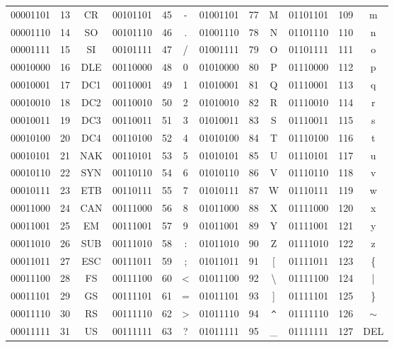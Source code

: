 \documentclass[12pt, oneside, landscape]{article}
\begin{document}
\begin{center}
\begin{tabular}{|ccc|ccc|ccc|ccc|}
    00001101 & 13 & CR   & 00101101 & 45 & -         & 01001101 & 77 & M   & 01101101 & 109 & m   \\
    00001110 & 14 & SO   & 00101110 & 46 & .         & 01001110 & 78 & N   & 01101110 & 110 & n   \\
    00001111 & 15 & SI   & 00101111 & 47 & /         & 01001111 & 79 & O   & 01101111 & 111 & o   \\
    00010000 & 16 & DLE  & 00110000 & 48 & 0         & 01010000 & 80 & P   & 01110000 & 112 & p   \\
    00010001 & 17 & DC1  & 00110001 & 49 & 1         & 01010001 & 81 & Q   & 01110001 & 113 & q   \\
    00010010 & 18 & DC2  & 00110010 & 50 & 2         & 01010010 & 82 & R   & 01110010 & 114 & r   \\
    00010011 & 19 & DC3  & 00110011 & 51 & 3         & 01010011 & 83 & S   & 01110011 & 115 & s   \\
    00010100 & 20 & DC4  & 00110100 & 52 & 4         & 01010100 & 84 & T   & 01110100 & 116 & t   \\
    00010101 & 21 & NAK  & 00110101 & 53 & 5         & 01010101 & 85 & U   & 01110101 & 117 & u   \\
    00010110 & 22 & SYN  & 00110110 & 54 & 6         & 01010110 & 86 & V   & 01110110 & 118 & v   \\
    00010111 & 23 & ETB  & 00110111 & 55 & 7         & 01010111 & 87 & W   & 01110111 & 119 & w   \\
    00011000 & 24 & CAN  & 00111000 & 56 & 8         & 01011000 & 88 & X   & 01111000 & 120 & x   \\
    00011001 & 25 & EM   & 00111001 & 57 & 9         & 01011001 & 89 & Y   & 01111001 & 121 & y   \\
    00011010 & 26 & SUB  & 00111010 & 58 & :         & 01011010 & 90 & Z   & 01111010 & 122 & z   \\
    00011011 & 27 & ESC  & 00111011 & 59 & ;         & 01011011 & 91 & [   & 01111011 & 123 & \{   \\
    00011100 & 28 & FS   & 00111100 & 60 & <         & 01011100 & 92 & \textbackslash & 01111100 & 124 & |   \\
    00011101 & 29 & GS   & 00111101 & 61 & =         & 01011101 & 93 & ]   & 01111101 & 125 & \}   \\
    00011110 & 30 & RS   & 00111110 & 62 & >         & 01011110 & 94 & \verb|^|   & 01111110 & 126 & $\sim$   \\
    00011111 & 31 & US   & 00111111 & 63 & ?         & 01011111 & 95 & \_   & 01111111 & 127 & DEL \\
    \hline
    \end{tabular}
\end{center}
\normalsize
\newpage



\vspace{5em}
\end{document}
